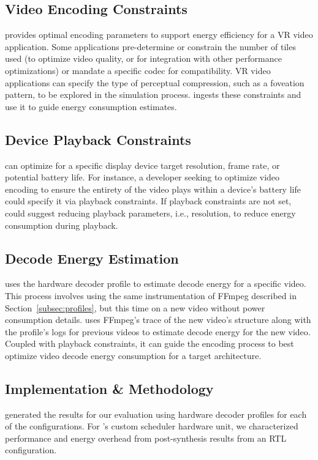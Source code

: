 \subsection{Video Encoding Constraints}
\nameArchprof provides optimal encoding parameters to support energy efficiency for a VR video application.
Some applications pre-determine or constrain the number of tiles used (to optimize video quality, or for integration with other performance optimizations) or mandate a specific codec for compatibility.
VR video applications can specify the type of perceptual compression, such as a foveation pattern, to be explored in the simulation process.
\nameArchprof ingests these constraints and use it to guide energy consumption estimates.

\subsection{Device Playback Constraints}
\nameArchprof can optimize for a specific display device target resolution, frame rate, or potential battery life.
For instance, a developer seeking to optimize video encoding to ensure the entirety of the video plays within a device's battery life could specify it via playback constraints.
If playback constraints are not set, \nameArchprof could suggest reducing playback parameters, i.e., resolution, to reduce energy consumption during playback.

\subsection{Decode Energy Estimation}
\nameArchprof uses the hardware decoder profile to estimate decode energy for a specific video.
This process involves using the same instrumentation of {FFmpeg} described in Section~\ref{subsec:profiles}, but this time on a new video without power consumption details.
\nameArchprof uses {FFmpeg}'s trace of the new video's structure along with the profile's logs for previous videos to estimate decode energy for the new video.
Coupled with playback constraints, it can guide the encoding process to best optimize video decode energy consumption for a target architecture.


\subsection{Implementation \& Methodology}
\nameArchprof generated the results for our evaluation using hardware decoder profiles for each of the \nameArch configurations.
For \nameArch's custom scheduler hardware unit, we characterized performance and energy overhead from post-synthesis results from an RTL configuration.

